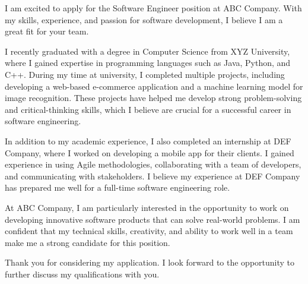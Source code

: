 
\address{Level 8, 15 King Street\\Sydney, NSW 2000}

\subject{Re: Application for Software Engineer Position}


\begin{coverletter}

I am excited to apply for the Software Engineer position at ABC Company. With my skills, experience, and passion for software development, I believe I am a great fit for your team.

I recently graduated with a degree in Computer Science from XYZ University, where I gained expertise in programming languages such as Java, Python, and C++. During my time at university, I completed multiple projects, including developing a web-based e-commerce application and a machine learning model for image recognition. These projects have helped me develop strong problem-solving and critical-thinking skills, which I believe are crucial for a successful career in software engineering.

In addition to my academic experience, I also completed an internship at DEF Company, where I worked on developing a mobile app for their clients. I gained experience in using Agile methodologies, collaborating with a team of developers, and communicating with stakeholders. I believe my experience at DEF Company has prepared me well for a full-time software engineering role.

At ABC Company, I am particularly interested in the opportunity to work on developing innovative software products that can solve real-world problems. I am confident that my technical skills, creativity, and ability to work well in a team make me a strong candidate for this position.

Thank you for considering my application. I look forward to the opportunity to further discuss my qualifications with you.

\end{coverletter}